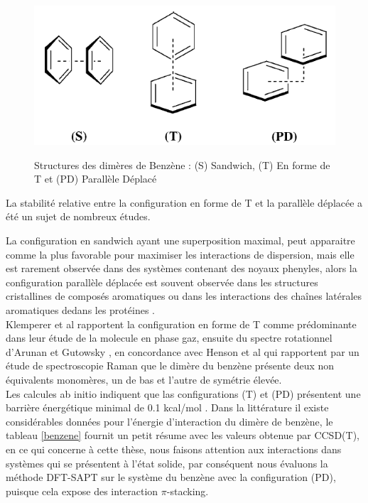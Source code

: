  \begin{figure}[H]
 \centering
 \includegraphics[scale=0.8]{image/Prot} \label{figprot}
 \caption[Structures du dimère de Benzène]{Structures des dimères de Benzène : (S) Sandwich, (T) En forme de T et (PD) Parallèle Déplacé}
 \end{figure}
 
 La stabilité relative entre la configuration en forme de T et la parallèle déplacée a été un sujet de nombreux études.
 
 La configuration en sandwich ayant une superposition maximal, peut apparaitre comme la plus favorable pour maximiser les interactions de dispersion, mais elle est rarement observée dans des systèmes contenant des noyaux phenyles, alors la configuration parallèle déplacée est souvent observée dans les structures cristallines de composés aromatiques \cite{hunter1991pi,fyfe1997synthetic,rebek1996assembly} ou dans les interactions des chaînes latérales aromatiques dedans les protéines \cite{hunter1991pi,burley1985aromatic}.\\
 
 Klemperer et al \cite{janda1975benzene} rapportent la configuration en forme de T comme prédominante dans leur étude de la molecule en phase gaz, ensuite du spectre rotationnel d'Arunan et Gutowsky \cite{arunan1993rotational}, en concordance avec Henson et al \cite{henson1992raman} qui rapportent par un étude de spectroscopie Raman que le dimère du benzène présente deux non équivalents monomères, un de bas et l'autre de symétrie élevée.\\ 
 
 Les calcules ab initio indiquent que las configurations (T) et (PD) présentent une barrière énergétique minimal de 0.1 kcal/mol \cite{park2006accurate}. Dans la littérature il existe considérables données pour l'énergie d'interaction du dimère de benzène, le tableau \ref{benzene} fournit un petit résume avec les valeurs obtenue par CCSD(T), en ce qui concerne à cette thèse, nous faisons attention aux interactions dans systèmes qui se présentent à l'état solide, par conséquent nous évaluons la méthode DFT-SAPT sur le système du benzène avec la configuration (PD), puisque cela expose des interaction $\pi$-stacking.
 
